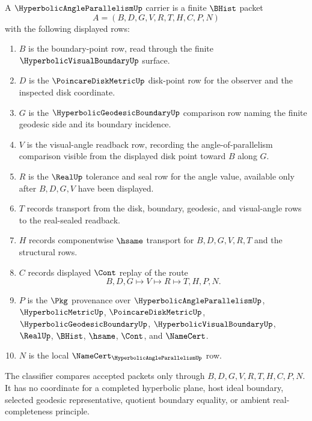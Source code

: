 \begin{definition}
\label{def:hyperbolic-angle-parallelism-carrier}
A $\HyperbolicAngleParallelismUp$ carrier is a finite $\BHist$ packet
$$
A=(B,D,G,V,R,T,H,C,P,N)
$$
with the following displayed rows:
\begin{enumerate}
\item $B$ is the boundary-point row, read through the finite $\HyperbolicVisualBoundaryUp$ surface.
\item $D$ is the $\PoincareDiskMetricUp$ disk-point row for the observer and the inspected disk coordinate.
\item $G$ is the $\HyperbolicGeodesicBoundaryUp$ comparison row naming the finite geodesic side and its boundary incidence.
\item $V$ is the visual-angle readback row, recording the angle-of-parallelism comparison visible from the displayed disk point toward $B$ along $G$.
\item $R$ is the $\RealUp$ tolerance and seal row for the angle value, available only after $B,D,G,V$ have been displayed.
\item $T$ records transport from the disk, boundary, geodesic, and visual-angle rows to the real-sealed readback.
\item $H$ records componentwise $\hsame$ transport for $B,D,G,V,R,T$ and the structural rows.
\item $C$ records displayed $\Cont$ replay of the route
$$
B,D,G \longmapsto V \longmapsto R \longmapsto T,H,P,N .
$$
\item $P$ is the $\Pkg$ provenance over $\HyperbolicAngleParallelismUp$, $\HyperbolicMetricUp$, $\PoincareDiskMetricUp$, $\HyperbolicGeodesicBoundaryUp$, $\HyperbolicVisualBoundaryUp$, $\RealUp$, $\BHist$, $\hsame$, $\Cont$, and $\NameCert$.
\item $N$ is the local $\NameCert_{\HyperbolicAngleParallelismUp}$ row.
\end{enumerate}
The classifier compares accepted packets only through $B,D,G,V,R,T,H,C,P,N$. It has no coordinate for a completed hyperbolic plane, host ideal boundary, selected geodesic representative, quotient boundary equality, or ambient real-completeness principle.
\end{definition}

